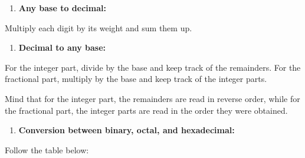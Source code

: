\documentclass[
  a4paper,
]{article}
\providecommand{\tightlist}{%
  \setlength{\itemsep}{0pt}\setlength{\parskip}{0pt}}
\begin{document}
\begin{enumerate}
\def\labelenumi{\arabic{enumi}.}
\tightlist
\item
  \textbf{Any base to decimal:}
\end{enumerate}

Multiply each digit by its weight and sum them up.

\begin{enumerate}
\def\labelenumi{\arabic{enumi}.}
\setcounter{enumi}{1}
\tightlist
\item
  \textbf{Decimal to any base:}
\end{enumerate}

For the integer part, divide by the base and keep track of the
remainders. For the fractional part, multiply by the base and keep track
of the integer parts.

Mind that for the integer part, the remainders are read in reverse
order, while for the fractional part, the integer parts are read in the
order they were obtained.

\begin{enumerate}
\def\labelenumi{\arabic{enumi}.}
\setcounter{enumi}{2}
\tightlist
\item
  \textbf{Conversion between binary, octal, and hexadecimal:}
\end{enumerate}

Follow the table below:
\end{document}
